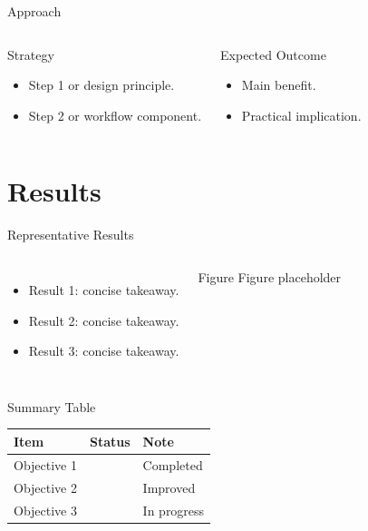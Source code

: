 \documentclass[hyperref={bookmarks=false},aspectratio=169]{beamer}
\newcommand{\cmark}{\textcolor{XLAccent}{\ding{51}}}
\newcommand{\xmark}{\textcolor{XLAlert}{\ding{55}}}
\begin{document}
\begin{frame}{Approach}
  \begin{columns}[T,totalwidth=\textwidth]
      \begin{block}{Strategy}
        \begin{itemize}
          \item Step 1 or design principle.
          \item Step 2 or workflow component.
        \end{itemize}
      \end{block}
      \begin{exampleblock}{Expected Outcome}
        \begin{itemize}
          \item Main benefit.
          \item Practical implication.
        \end{itemize}
      \end{exampleblock}
  \end{columns}
\end{frame}

\section{Results}

\begin{frame}{Representative Results}
  \begin{columns}[T,totalwidth=\textwidth]
      \begin{itemize}
        \item Result 1: concise takeaway.
        \item Result 2: concise takeaway.
        \item Result 3: concise takeaway.
      \end{itemize}
      \begin{block}{Figure}
        \centering
        \vspace{1.2cm}
        Figure placeholder
        \vspace{1.2cm}
      \end{block}
  \end{columns}
\end{frame}

\begin{frame}{Summary Table}
  \centering
  \begin{tabular}{lll}
    \toprule
    Item & Status & Note \\
    \midrule
    Objective 1 & \cmark & Completed \\
    Objective 2 & \cmark & Improved \\
    Objective 3 & \xmark & In progress \\
    \bottomrule
  \end{tabular}
\end{frame}
\end{document}

